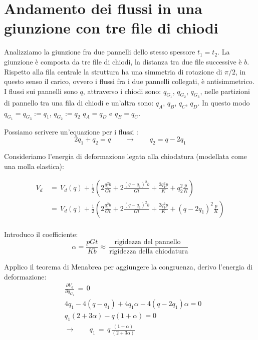 \section{Andamento dei flussi in una giunzione con tre file di chiodi}

Analizziamo la giunzione fra due pannelli dello stesso spessore $t_1=t_2$. La giunzione è composta da tre file di chiodi, la distanza tra due file successive è $b$. Rispetto alla fila centrale la struttura ha una simmetria di rotazione di $\pi/2$, in questo senso il carico, ovvero i flussi fra i due pannelli collegati, è antisimmetrico.\\
I flussi sui pannelli sono $q$, attraverso i chiodi sono: $q_{G_1}$, $q_{G_2}$, $q_{G_3}$, nelle partizioni di pannello tra una fila di chiodi e un'altra sono: $q_A$, $q_B$, $q_C$, $q_D$. In questo modo $q_{G_1}=q_{G_3}:=q_1$, $q_{G_2}:=q_2$ $q_A=q_D$ e $q_B=q_C$.

Possiamo scrivere un'equazione per i flussi :
\begin{equation*}
    2q_1+q_2=q   \qquad\rightarrow\qquad q_2=q-2q_1
\end{equation*}

Consideriamo l'energia di deformazione legata alla chiodatura (modellata come una molla elastica):

\begin{align*}
    V_{d}\,&=\,V_d(q) +\frac{1}{2} \left( 2\frac{q_1^2b}{Gt}  + 2\frac{(q-q_1)^2b}{Gt} + \frac{2q_1^2p}{K} + q_2^2\frac{p}{K}   \right)\\
    &=\,V_d(q) +\frac{1}{2} \left( 2\frac{q_1^2b}{Gt}  + 2\frac{(q-q_1)^2b}{Gt} + \frac{2q_1^2p}{K} + (q-2q_1)^2\frac{p}{K}   \right)\\
\end{align*}

Introduco il coefficiente:
\begin{equation*}
 \alpha=\frac{pGt}{Kb}\approx\,\frac{\text{rigidezza del pannello }}{\text{rigidezza della chiodatura}}
\end{equation*}

Applico il teorema di Menabrea per aggiungere la congruenza, derivo l'energia di deformazione:
\begin{align*}
     &\frac{\partial V_d}{\partial q_{G_1}}\,=\,0  \\
     &4q_1-4(q-q_1)+4q_1\alpha -4(q-2q_1)\alpha=0                                     \\
      &         q_1(2+3\alpha)-q(1+\alpha)  =0                           \\      
   &\rightarrow\qquad q_1\,=\,q\,\frac{(1+\alpha)}{(2+3\alpha)}  
\end{align*}


